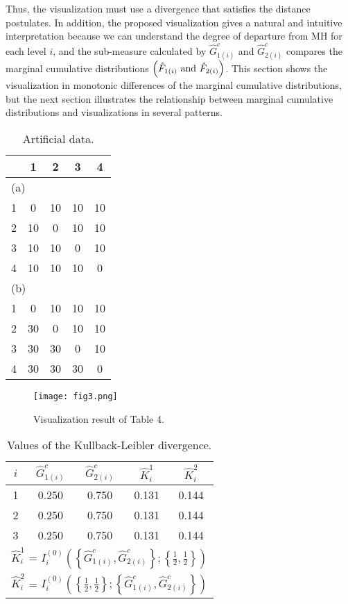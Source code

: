 \documentclass[a4j,12pt]{article}
\begin{document}
Thus, the visualization must use a divergence that satisfies the distance postulates. 
In addition, the proposed visualization gives a natural and intuitive interpretation because we can understand the degree of departure from MH for each level $i$, and the sub-measure calculated by $\hat{G}^c_{1(i)}$ and $\hat{G}^c_{2(i)}$  compares the marginal cumulative distributions $\left( \hat{F}_{1(i)}~{\rm and}~\hat{F}_{2(i)}  \right)$.
This section shows the visualization in monotonic differences of the marginal cumulative distributions, but the next section illustrates the relationship between marginal cumulative distributions and visualizations in several patterns.
\begin{table}[h]
\small\sf\centering
\caption{Artificial data.\label{T4}}
\begin{tabular}[!bh]{ccccc} \hline
	& 1	& 2	& 3	& 4	\\ \hline
\multicolumn{5}{l}{(a)}\\ 
1	& 0	& 10	& 10	& 10	\\
2	& 10	& 0	& 10	& 10	\\
3	& 10	& 10	& 0	& 10	\\
4	& 10	& 10	& 10	& 0	\\ \hline
\multicolumn{5}{l}{(b)}\\ 
1	& 0	& 10	& 10	& 10	\\
2	& 30	& 0	& 10	& 10	\\
3	& 30	& 30	& 0	& 10	\\
4	& 30	& 30	& 30	& 0	\\ \hline
\end{tabular}
\end{table}
\begin{figure}[h]
\centering
\texttt{[image: fig3.png]}
\caption{Visualization result of Table 4.}
\end{figure}
\begin{table}[h]
\small\sf\centering
\caption{Values of the Kullback-Leibler divergence.\label{T5}}
\begin{tabular}[!bh]{ccccc} \hline
$i$	& $\hat{G}^c_{1(i)}$	& $\hat{G}^c_{2(i)}$	& $\hat{K}^1_i$	& $\hat{K}^2_i$	\\ \hline
1	& 0.250		& 0.750		& 0.131		& 0.144		\\
2	& 0.250		& 0.750		& 0.131		& 0.144		\\
3	& 0.250		& 0.750		& 0.131		& 0.144		\\ \hline
\multicolumn{5}{l}{$\hat{K}^1_i$ = $I^{(0)}_i \left( \left\{ \hat{G}^c_{1(i)}, \hat{G}^c_{2(i)} \right\} ; \left\{ \frac{1}{2}, \frac{1}{2} \right\} \right)$} \\
\multicolumn{5}{l}{$\hat{K}^2_i$ = $I^{(0)}_i \left( \left\{ \frac{1}{2}, \frac{1}{2} \right\} ; \left\{ \hat{G}^c_{1(i)}, \hat{G}^c_{2(i)} \right\} \right)$} \\
\end{tabular}
\end{table}
\\
\end{document}
